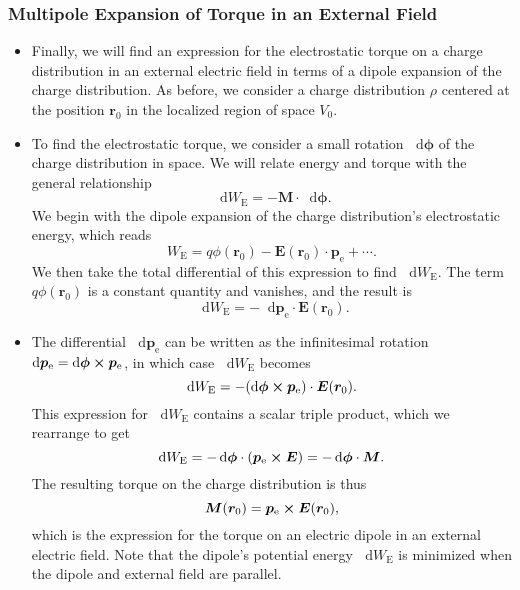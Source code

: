\documentclass[11pt, a4paper]{article}
\newcommand{\diff}{\mathop{}\!\mathrm{d}} %
\renewcommand{\vec}[1]{\bm{#1}} %
\renewcommand{\r}{\vec{r}}
\newcommand{\E}{\vec{E}} %
\newcommand{\pe}{\vec{p}_{\text{e}}}  %
\begin{document}
\subsubsection{Multipole Expansion of Torque in an External Field}
\begin{itemize}
	\item  Finally, we will find an expression for the electrostatic torque on a charge distribution in an external electric field in terms of a dipole expansion of the charge distribution. As before, we consider a charge distribution $ \rho $ centered at the position $ \r_{0} $ in the localized region of space $ V_{0} $. 
	
	\item To find the electrostatic torque, we consider a small rotation $ \diff \vec{\phi} $ of the charge distribution in space. We will relate energy and torque with the general relationship
	\begin{equation*}
		\diff W_{\text{E}} = - \vec{M} \cdot \diff \vec{\phi}.
	\end{equation*}
	We begin with the dipole expansion of the charge distribution's electrostatic energy, which reads
	\begin{equation*}
		W_{\text{E}} = q \phi(\r_{0}) - \E (\r_{0}) \cdot \pe + \cdots.
	\end{equation*}
    We then take the total differential of this expression to find $ \diff W_{\text{E}} $. The term $ q \phi(\r_{0}) $ is a constant quantity and vanishes, and the result is
	\begin{equation*}
		\diff W_{\text{E}} = - \diff \pe \cdot \E(\r_{0}).
	\end{equation*}
    
    \item The differential $ \diff \pe $ can be written as the infinitesimal rotation $ \diff \pe = \diff \vec{\phi} \cross \pe $, in which case $ \diff W_{\text{E}} $ becomes
	\begin{equation*}
		\diff W_{\text{E}} = - (\diff \vec{\phi} \cross \pe)\cdot \E(\r_{0}).
	\end{equation*}
	This expression for $ \diff W_{\text{E}} $ contains a scalar triple product, which we rearrange to get
	\begin{equation*}
		\diff W_{\text{E}} = - \diff \vec{\phi} \cdot (\pe \cross \E) = - \diff \vec{\phi} \cdot \vec{M}.
	\end{equation*}
    The resulting torque on the charge distribution is thus 
    \begin{equation*}
       \vec{M}(\r_{0}) = \pe \cross \E(\r_{0}),
    \end{equation*}
    which is the expression for the torque on an electric dipole in an external electric field. Note that the dipole's potential energy $ \diff W_{\text{E}} $ is minimized when the dipole and external field are parallel.
	
\end{itemize}
\end{document}
